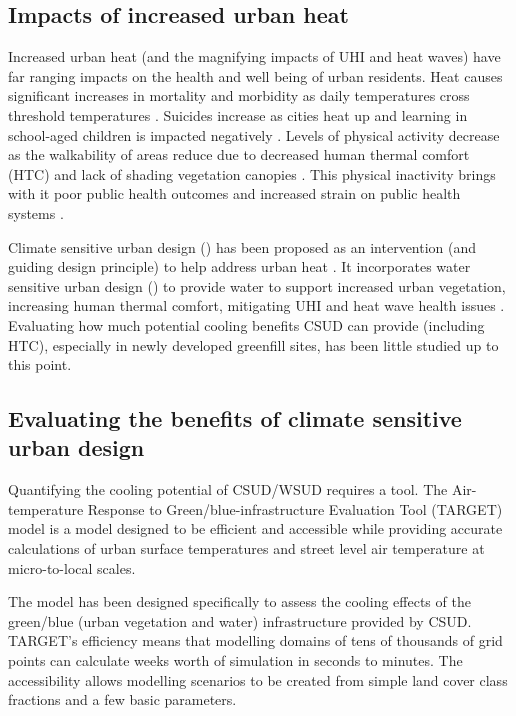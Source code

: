 \documentclass[final,3p,times,authoryear]{elsarticle}
\begin{document}
\subsection{Impacts of increased urban heat}
Increased urban heat (and the magnifying impacts of UHI and heat waves) have far ranging impacts on the health and well being of urban residents. Heat causes significant increases in mortality and morbidity as daily temperatures cross threshold temperatures \citep{Nicholls2008}. Suicides increase as cities heat up \citep{Burke2018a} and learning in school-aged children is impacted negatively \citep{Goodman2018}. Levels of physical activity decrease as the walkability of areas reduce due to decreased human thermal comfort (HTC) and lack of shading vegetation canopies \citep{Millington2009,Gallin2001,LSA2003}. This physical inactivity brings with it poor public health outcomes and increased strain on public health systems  \citep{Davison2008,Lee2008b,Warburton2006,WHO2010}.



Climate sensitive urban design () has been proposed as an intervention (and guiding design principle) to help address urban heat \citep{Coutts2012,Oke2017}. It incorporates water sensitive urban design () \citep{Wong2009} to provide water to support increased urban vegetation, increasing human thermal comfort, mitigating UHI and heat wave health issues \citep{Bowler2010}. Evaluating how much potential cooling benefits CSUD can provide (including HTC), especially in newly developed greenfill sites, has been little studied up to this point.

\subsection{Evaluating the benefits of climate sensitive urban design}
Quantifying the cooling potential of CSUD/WSUD requires a tool. The Air-temperature Response to Green/blue-infrastructure Evaluation Tool (TARGET) model \citep{Broadbent2018} is a model designed to be efficient and accessible while providing accurate calculations of urban surface temperatures and street level air temperature at micro-to-local scales. 

The model has been designed specifically to assess the cooling effects of the green/blue (urban vegetation and water) infrastructure provided by CSUD. TARGET's efficiency means that modelling domains of tens of thousands of grid points can calculate weeks worth of simulation in seconds to minutes. The accessibility allows modelling scenarios to be created from simple land cover class fractions and a few basic parameters.
\end{document}
